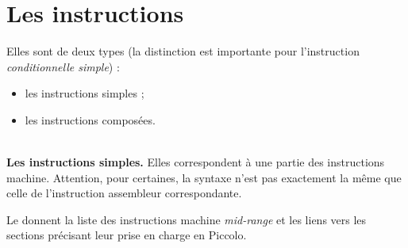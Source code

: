 \section{Les instructions}

Elles sont de deux types (la distinction est importante pour l’instruction \emph{conditionnelle simple}) :
\begin{itemize}
  \item les instructions simples ;
  \item les instructions composées.

\end{itemize}


~\\
\textbf{Les instructions simples.} Elles correspondent à une partie des instructions machine. Attention, pour certaines, la syntaxe n'est pas exactement la même que celle de l'instruction assembleur correspondante.

Le  donnent la liste des instructions machine \emph{mid-range} et les liens vers les sections précisant leur prise en charge en Piccolo.

